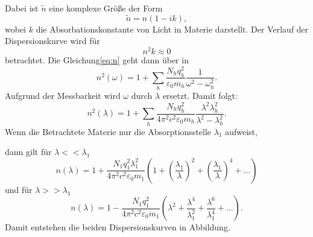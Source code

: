 Dabei ist $\tilde{n}$ eine komplexe Größe der Form
\begin{equation}
  \tilde{n} = n(1 - ik) ,
\end{equation}
wobei $k$ die Absorbationskonstante von Licht in Materie darstellt.
Der Verlauf der Dispersionskurve wird für
\begin{equation}
  n^2 k \approx 0
\end{equation}
betrachtet.
Die Gleichung\eqref{eq:n} geht dann über in
\begin{equation}
  n^2 (\omega) = 1 + \sum_{h} \frac{N_h q_h ^2}{\varepsilon_0 m_h}\frac {1}{\omega ^2 -\omega_h ^2} .
\end{equation}
Aufgrund der Messbarkeit wird $\omega$ durch $\lambda$ ersetzt.
Damit folgt:
\begin{equation}
  n^2 (\lambda) = 1 + \sum_{h} \frac{N_h q_h ^2}{4 \pi^2 c^2 \varepsilon_0 m_h}\frac{\lambda^2\lambda_h ^2}{\lambda^2 - \lambda_h ^2} .
\end{equation}
Wenn die Betrachtete Materie nur die Absorptionsstelle $\lambda_1$ aufweist,

\noindent dann gilt für $\lambda << \lambda_1$
\begin{equation}
  n(\lambda) = 1 + \frac{N_1 q_1 ^2 \lambda_1 ^2}{4 \pi^2 c^2 \varepsilon_0 m_1}(1 + (\frac{\lambda_1}{\lambda})^2 + (\frac{\lambda_1}{\lambda})^4 + ...)
\end{equation}
und für $\lambda >> \lambda_1$
\begin{equation}
  n(\lambda) = 1 - \frac{N_1 q_1 ^2 }{4 \pi^2 c^2 \varepsilon_0 m_1}(\lambda^2+ \frac{\lambda^4}{\lambda_1 ^2} + \frac{\lambda^6}{\lambda_1 ^4} + ...)  .
\end{equation}
Damit entstehen die beiden Dispersionskurven in Abbildung.
